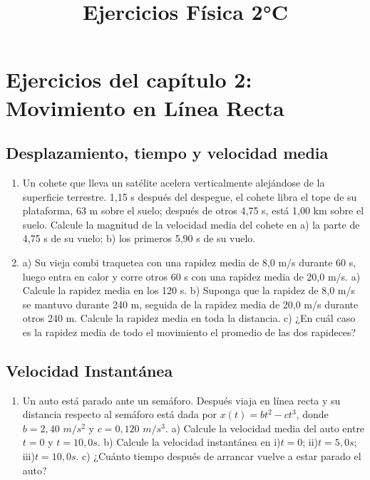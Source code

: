 \documentclass[a4paper, 12pt]{article}
\title{Ejercicios Física 2°C}
\newcommand\setItemnumber[1]{\setcounter{enumi}{\numexpr#1-1\relax}}
\begin{document}
\section*{Ejercicios del capítulo 2: Movimiento en Línea Recta}
\subsection*{Desplazamiento, tiempo y velocidad media}
\begin{enumerate}
\setItemnumber{1}
  \item Un cohete que lleva un satélite acelera verticalmente alejándose de la superficie terrestre. 1,15 s después del despegue, el cohete libra el tope de su plataforma, 63 m sobre el suelo; después de otros 4,75 s, está 1,00 km sobre el suelo. Calcule la magnitud de la velocidad media del cohete en a) la parte de 4,75 s de su vuelo; b) los primeros 5,90 s de su vuelo.
\setItemnumber{7}
  \item a) Su vieja combi traquetea con una rapidez media de 8,0 m/s durante 60 s, luego entra en calor y corre otros 60 s con una rapidez media de 20,0 m/s. a) Calcule la rapidez media en los 120 s. b) Suponga que la rapidez de 8,0 m/s se mantuvo durante 240 m, seguida de la rapidez media de 20,0 m/s durante otros 240 m. Calcule la rapidez media en toda la distancia. c) ¿En cuál caso es la rapidez media de todo el movimiento el promedio de las dos rapideces?
\end{enumerate}
\subsection*{Velocidad Instantánea}
\begin{enumerate}
  \setItemnumber{9}
  \item Un auto está parado ante un semáforo. Después viaja en línea recta y su distancia respecto al semáforo está dada por $ x(t) = bt^{2} - ct^{3} $, donde $ b = 2,40$  $m/s^{2} $ y $ c = 0,120$  $m/s^{3} $. a) Calcule la velocidad media del auto entre $ t = 0$ y $ t = 10,0 s $. b) Calcule la velocidad instantánea en i)$ t = 0$; ii)$ t = 5,0 s$; iii)$ t = 10,0s$. c) ¿Cuánto tiempo después de arrancar vuelve a estar parado el auto?
    \end{enumerate}
\end{document}

